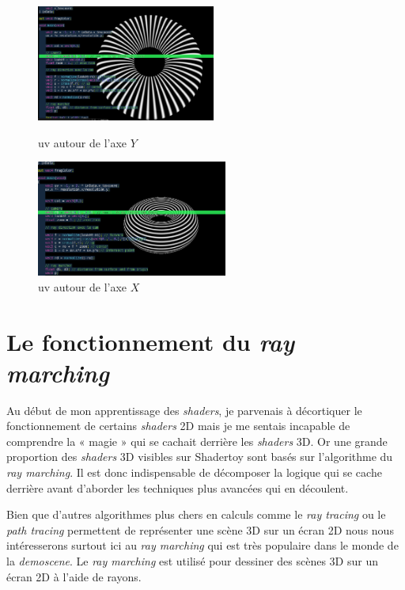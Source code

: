 \begin{figure}[h]
  \begin{minipage}[b]{0.45\linewidth}
    \centering
    \includegraphics[width=\linewidth, height=1.5in]{images//sdf/tore03.png}
    \caption{uv autour de l'axe $Y$}
    \label{tore03}
  \end{minipage}
  \hspace{0.1\linewidth} %
  \begin{minipage}[b]{0.45\linewidth}
    \centering
    \includegraphics[width=\linewidth, height=1.5in]{images//sdf/tore05.png}
    \caption{uv autour de l'axe $X$}
    \label{tore05}
  \end{minipage}
\end{figure}

\newpage
\section{Le fonctionnement du \textit{ray marching}}
Au début de mon apprentissage des \textit{shaders}, je parvenais à décortiquer le fonctionnement de certains \textit{shaders} 2D mais je me sentais incapable de comprendre la « magie » qui se cachait derrière les \textit{shaders} 3D. Or une grande proportion des \textit{shaders} 3D visibles sur Shadertoy sont basés sur l'algorithme du \textit{ \textit{ray marching}}. Il est donc indispensable de décomposer la logique qui se cache derrière avant d'aborder les techniques plus avancées qui en découlent.

Bien que d'autres algorithmes plus chers en calculs comme le \textit{ray tracing} ou le \textit{path tracing} permettent de représenter une scène 3D sur un écran 2D nous nous intéresserons surtout ici au \textit{ray marching} qui est très populaire dans le monde de la \textit{demoscene}. Le  \textit{ray marching} est utilisé pour dessiner des scènes 3D sur un écran 2D à l'aide de rayons.

